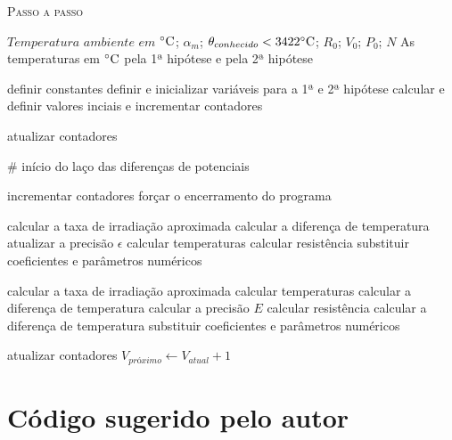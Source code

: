 \documentclass[12pt]{article}
\newcommand\OR{\bf{\,or\, }}
\begin{document}
\begin{algorithm}[H]

\clearpage
{}
\label{alg1}
\caption{\textsc{Passo a passo}}
\begin{algorithmic}[1]

\Require $Temperatura$ $ambiente$ $em$ $\celsius$; $\alpha_m$; $\theta_{conhecido}<3422\celsius$; $R_0$; $V_0$; $P_0$; $N$  
%
\Ensure 
As temperaturas em $\celsius$ pela 1ª hipótese e pela 2ª hipótese
\Statex
\hspace{-0.85cm}
\Return
\hspace{0.85cm}

\State definir constantes
\State definir e inicializar variáveis para a 1ª e 2ª hipótese
 
\State calcular e definir valores inciais e incrementar contadores

\Else 
\State atualizar contadores

\State $\#$ início do laço das diferenças de potenciais

\While{$\epsilon > 0,1 {\OR} E>0,1$} 
\State {}
\State incrementar contadores
\State forçar o encerramento do programa

\EndIf
{} 
\State calcular a taxa de irradiação aproximada
\State calcular a diferença de temperatura
\State atualizar a precisão $\epsilon$
\State calcular temperaturas
\State calcular resistência
\State substituir coeficientes e parâmetros numéricos  

\EndIf
\Statex
{}
\State calcular a taxa de irradiação aproximada 
\State calcular temperaturas
\State calcular a diferença de temperatura
\State calcular a precisão $E$
\State calcular resistência
\State calcular a diferença de temperatura
\State substituir coeficientes e parâmetros numéricos


\EndIf
\EndWhile
\EndIf 

\State atualizar contadores
    \State $V_{próximo}\longleftarrow V_{atual}+1$
\EndWhile
\Statex
\hspace{-0.85cm}
\algorithmicPrint{}
\hspace{0.85cm}


\end{algorithmic}
\end{algorithm}



\newpage
\section{Código sugerido pelo autor}
\end{document}
